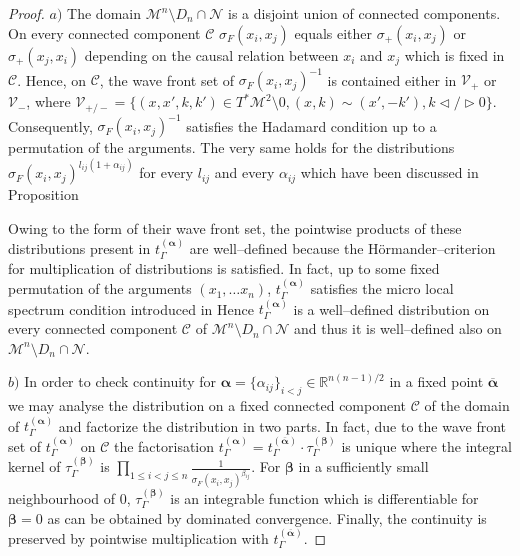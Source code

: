 \documentclass[10pt]{book}
\newcommand{\Mcal}{\mathcal{M}}
\newcommand{\Ncal}{\mathcal{N}}
\theoremstyle{break}
\begin{document}
\begin{proof}

$a)$ The domain $\Mcal^n\setminus D_n\cap \Ncal$ is a disjoint union of connected components. On every connected component $\mathcal{C}$ $\sigma_F(x_i,x_j)$ equals either $\sigma_+(x_i,x_j)$ or $\sigma_+(x_j,x_i)$ depending on the causal relation between $x_i$ and $x_j$ which is fixed in $\mathcal{C}$.
Hence, on $\mathcal{C}$, the wave front set of $\sigma_F(x_i,x_j)^{-1}$ is contained either in $\mathcal{V}_+$ or $\mathcal{V}_-$, where $\mathcal{V}_{+/-} = \{(x,x',k,k') \in T^*\Mcal^2\setminus 0, (x,k)\sim (x',-k'),  k \triangleleft / \triangleright 0  \}$. Consequently, $\sigma_F(x_i,x_j)^{-1}$ satisfies the Hadamard condition up to a permutation of the arguments. The very same holds for the distributions $\sigma_F(x_i,x_j)^{l_{ij}(1+\alpha_{ij})}$ for every $l_{ij}$ and every $\alpha_{ij}$ which have been discussed in Proposition %

Owing to the form of their wave front set, the pointwise products of these distributions present in $t_\Gamma^{(\boldsymbol{\alpha})}$ are well--defined because the H\"ormander--criterion for multiplication of distributions is satisfied. In fact, up to some fixed permutation of the arguments $(x_1,\dots x_n)$, $t_\Gamma^{(\boldsymbol{\alpha})}$ satisfies the micro local spectrum condition introduced in %
Hence $t_\Gamma^{(\boldsymbol{\alpha})}$ is a well--defined distribution on every connected component $\mathcal{C}$ of $\Mcal^n\setminus D_n\cap \Ncal$ and thus it is well--defined also on $\Mcal^n\setminus D_n\cap \Ncal$. 

$b)$ 
In order to check continuity for $\boldsymbol{\alpha}= \{\alpha_{ij}\}_{i<j}\in \mathbb{R}^{n(n-1)/2}$ in a fixed point $\overline{\boldsymbol{\alpha}}$ we may analyse the distribution on a fixed connected component $\mathcal{C}$ of the domain of $t_\Gamma^{(\boldsymbol{\alpha})}$ and factorize the distribution in two parts. 
In fact, due to the wave front set of $t_\Gamma^{(\boldsymbol{\alpha})}$ on $\mathcal{C}$ the factorisation $t_\Gamma^{(\boldsymbol{\alpha})} =t_\Gamma^{(\overline{\boldsymbol{\alpha}})} \cdot \tau_\Gamma^{(\boldsymbol{\beta})}$ is unique where the integral kernel of $\tau_\Gamma^{(\boldsymbol{\beta})}$ is $\prod_{1\leq i < j \leq n } \frac{1}{\sigma_F(x_i,x_j)^{\beta_{ij}}}$.
For $\boldsymbol{\beta}$ in a sufficiently small neighbourhood of $0$, $\tau_\Gamma^{(\boldsymbol{\beta})}$ is an integrable function which is differentiable for $\boldsymbol{\beta}=0$ as can be obtained by dominated convergence. Finally, the continuity is preserved by pointwise multiplication with $t_\Gamma^{(\overline{\boldsymbol{\alpha}})}$.


\end{proof}
\end{document}

